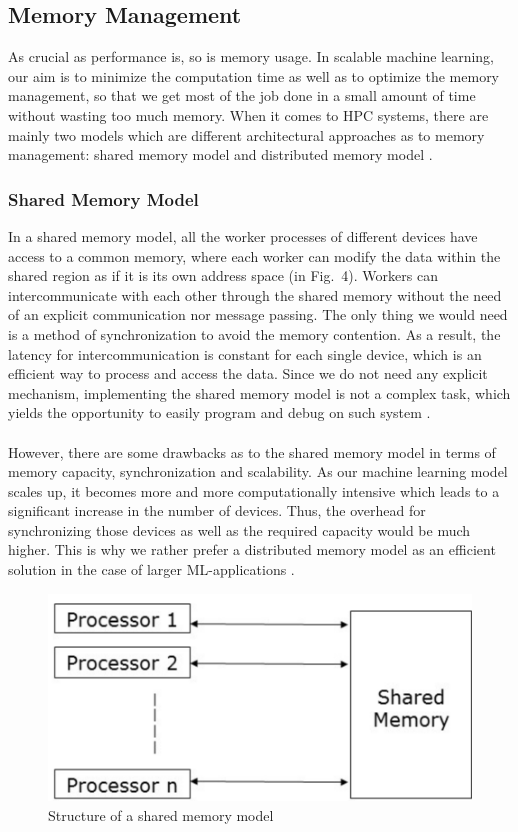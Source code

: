\documentclass[ieeetran]{article}
\begin{document}
\subsection{Memory Management} %
\label{sub:memory_management}
As crucial as performance is, so is memory usage. In scalable machine learning, our aim is to minimize the computation time as well as to optimize the memory management, so that we get most of the job done in a small amount of time without wasting too much memory. When it comes to HPC systems, there are mainly two models which are different architectural approaches as to memory management: shared memory model and distributed memory model \cite{second}.

\subsubsection{Shared Memory Model} %
\label{ssub:shared_memory_model}
In a shared memory model, all the worker processes of different devices have access to a common memory, where each worker can modify the data within the shared region as if it is its own address space (in Fig.\ 4). Workers can intercommunicate with each other through the shared memory without the need of an explicit communication nor message passing. The only thing we would need is a method of synchronization to avoid the memory contention. As a result, the latency for intercommunication is constant for each single device, which is an efficient way to process and access the data. Since we do not need any explicit mechanism, implementing the shared memory model is not a complex task, which yields the opportunity to easily program and debug on such system \cite{second} \cite{third}. 
\\ \\However, there are some drawbacks as to the shared memory model in terms of memory capacity, synchronization and scalability. As our machine learning model scales up, it becomes more and more computationally intensive which leads to a significant increase in the number of devices. Thus, the overhead for synchronizing those devices as well as the required capacity would be much higher. This is why we rather prefer a distributed memory model as an efficient solution in the case of larger ML-applications \cite{third}.


\begin{figure}[h!]
  \centering
  \includegraphics[width=0.4\linewidth]{sharedmemorymodel}
  \caption{Structure of a shared memory model}
  \label{fig:sharedmemorymodel}
\end{figure}
\end{document}
